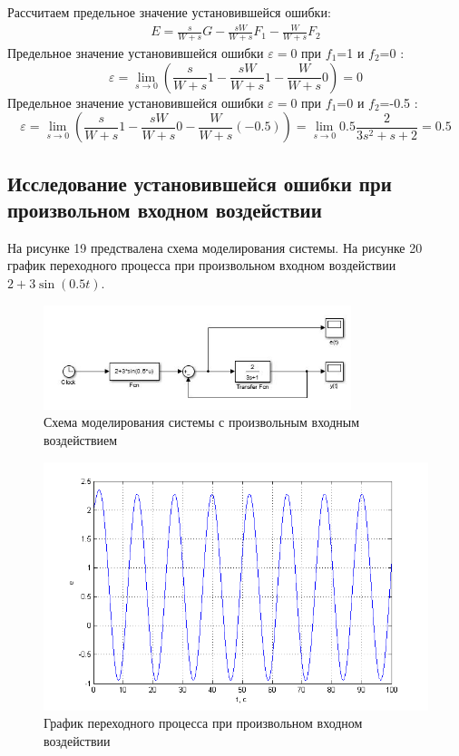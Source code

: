 \documentclass[a4paper, 12pt]{article}
\begin{document}
Рассчитаем предельное значение установившейся ошибки: \\
\begin{align}
E=\frac{s}{W+s}G-\frac{sW}{W+s}F_{1}-\frac{W}{W+s}F_{2} 
\end{align}
Предельное значение установившейся ошибки $\varepsilon=0$ при $f_1$=1 и $f_2$=0 : \\
\begin{equation}
\varepsilon= \lim_{s\to 0}(\frac{s}{W+s}1-\frac{sW}{W+s}1-\frac{W}{W+s}0)=0
\end{equation}
Предельное значение установившейся ошибки $\varepsilon=0$ при $f_1$=0 и $f_2$=-0.5 : \\
\begin{equation}
\varepsilon= \lim_{s\to 0}(\frac{s}{W+s}1-\frac{sW}{W+s}0-\frac{W}{W+s}(-0.5))=\lim_{s\to 0}0.5\frac{2}{3s^2+s+2}=0.5
\end{equation}
\newpage 
\begin{center}
	\section*{ Исследование установившейся ошибки при произвольном входном воздействии}
\end{center}\par
На рисунке 19 предствалена схема моделирования системы. На рисунке 20 график переходного процесса при произвольном входном воздействии $2+3\sin(0.5t)$.
\begin{figure}[h!]
	\centering
	\includegraphics[width = 0.8\textwidth]{sxema7}
	\caption{Схема моделирования системы с произвольным входным воздействием}
\end{figure}
\begin{figure}[h!]
	\centering
	\includegraphics[width = 1\textwidth]{hinh13}
	\caption{График переходного процесса при произвольном входном воздействии} 
\end{figure}
\end{document}
